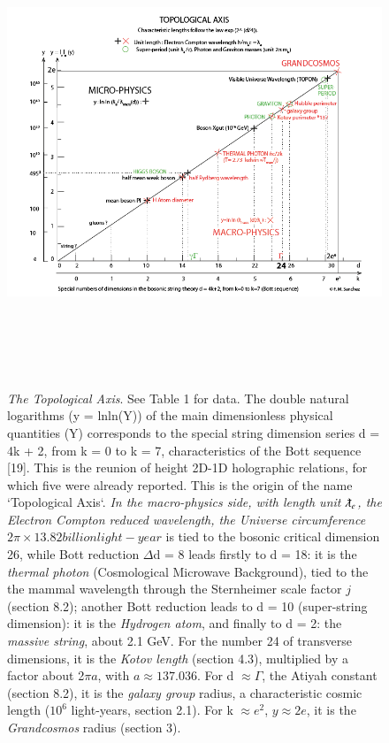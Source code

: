 \documentclass[twoside,draft]{article}
\begin{document}
\begin{sloppypar}

\begin{figure}
\centering
\includegraphics[width=\textwidth,height=14cm]{./figures/figure}
\caption{\textit{The Topological Axis}. See Table 1 for data. The double natural logarithms (y = lnln(Y)) of the main dimensionless physical quantities (Y) corresponds to the special string dimension series d = 4k + 2, from k = 0 to k = 7, characteristics of the Bott sequence [19]. This is the reunion of height 2D-1D holographic relations, for which five were already reported. This is the origin of the name `Topological Axis`. 
\textit{In the macro-physics side, with length unit $\lambdabar_e$, the Electron Compton reduced wavelength, the Universe circumference $2\pi \times 13.82 billion light-year$} is tied to the bosonic critical dimension 26, while Bott reduction $\Delta$d = 8 leads firstly to  d = 18: it is the \textit{thermal photon} (Cosmological Microwave Background), tied to the the mammal wavelength through the Sternheimer scale factor $j$ (section 8.2); another Bott reduction leads to d = 10 (super-string dimension): it is the \textit{Hydrogen atom}, and finally to d = 2: the \textit{massive string}, about 2.1 GeV. For the number 24 of transverse dimensions, it is the \textit{Kotov length} (section 4.3), multiplied by a factor about 2$\pi a$, with $a \approx 137.036$. For d $\approx \Gamma$, the Atiyah constant (section 8.2), it is the \textit{galaxy group} radius, a characteristic cosmic length ($10^{6}$ light-years, section 2.1). For k $\approx e^{2}$, $y \approx 2e$, it is the \textit{Grandcosmos} radius (section 3). 
}
\end{figure}
\end{sloppypar}
\end{document}
